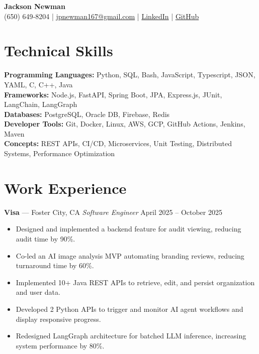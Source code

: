 \documentclass[letterpaper,11pt]{article}
\begin{document}
\begin{center}
  {\LARGE \textbf{Jackson Newman}}\\
    (650) 649‑8204 \;|\; \href{mailto:jpnewman167@gmail.com}{jpnewman167@gmail.com} \;|\; \href{https://www.linkedin.com/in/jacknewman/}{LinkedIn} \;|\; \href{https://github.com/JNewman-cell}{GitHub}
\end{center}

\section{Technical Skills}

\textbf{Programming Languages:}  Python, SQL,  Bash, JavaScript, Typescript, JSON, YAML, C, C++, Java \\
\textbf{Frameworks:} Node.js, FastAPI, Spring Boot, JPA, Express.js, JUnit,  LangChain, LangGraph \\
\textbf{Databases:} PostgreSQL, Oracle DB, Firebase, Redis \\
\textbf{Developer Tools:} Git, Docker, Linux, AWS, GCP, GitHub Actions, Jenkins, Maven \\
\textbf{Concepts:} REST APIs, CI/CD, Microservices, Unit Testing, Distributed Systems, Performance Optimization

\section{Work Experience}

\textbf{Visa} — Foster City, CA  
\textit{Software Engineer} \hfill April 2025 -- October 2025
\begin{itemize}[leftmargin=*, itemsep=2pt, parsep=0pt, topsep=2pt]
\item Designed and implemented a backend feature for audit viewing, reducing audit time by 90\%.
\item Co-led an AI image analysis MVP automating branding reviews, reducing turnaround time by 60\%.
\item Implemented 10+ Java REST APIs to retrieve, edit, and persist organization and user data.
\item Developed 2 Python APIs to trigger and monitor AI agent workflows and display responsive progress.
\item Redesigned LangGraph architecture for batched LLM inference, increasing system performance by 80\%.
\end{itemize}
\end{document}
